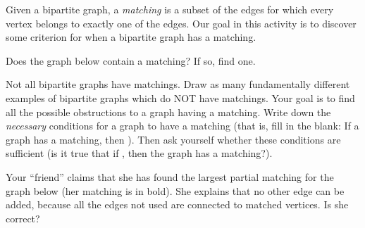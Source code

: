 \documentclass[11pt]{exam}
\newcommand{\vtx}[2]{node[fill,circle,inner sep=0pt, minimum size=4pt,label=#1:#2]{}}
\renewcommand{\v}{\vtx{above}{}}
\begin{document}

\noindent Given a bipartite graph, a {\em matching} is a subset of the edges for which every vertex belongs to exactly one of the edges.  Our goal in this activity is to discover some criterion for when a bipartite graph has a matching.

\begin{questions}
\question Does the graph below contain a matching?  If so, find one.

\begin{center}
\end{center}


\question Not all bipartite graphs have matchings.  Draw as many fundamentally different examples of bipartite graphs which do NOT have matchings.  Your goal is to find all the possible obstructions to a graph having a matching.  Write down the {\em necessary} conditions for a graph to have a matching (that is, fill in the blank: If a graph has a matching, then \underline{\hspace{1in}}).  Then ask yourself whether these conditions are sufficient (is it true that if \underline{\hspace{1in}}, then the graph has a matching?).

\newpage


\question Your ``friend'' claims that she has found the largest partial matching for the graph below (her matching is in bold).  She explains that no other edge can be added, because all the edges not used are connected to matched vertices.  Is she correct?


\end{questions}
\end{document}
